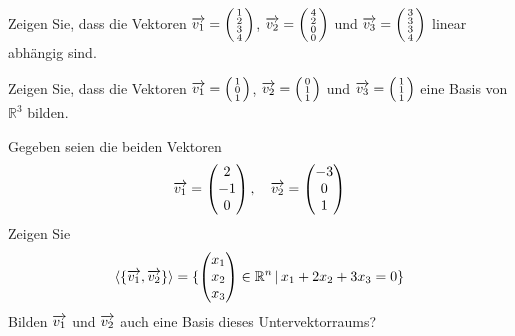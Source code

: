 \begin{aufgabe} Zeigen Sie, dass die Vektoren $\overrightarrow{v_1} = 
\left( \begin{smallmatrix} 1 \\ 2 \\ 3 \\ 4
\end{smallmatrix} \right)$, $\overrightarrow{v_2} = \left( \begin{smallmatrix} 4 \\ 2 \\ 0 \\ 0 
\end{smallmatrix} \right)$ und $\overrightarrow{v_3} = \left( \begin{smallmatrix} 3 \\ 3 \\ 3 \\ 4 
\end{smallmatrix} \right)$ linear abhängig sind.
\end{aufgabe}

\begin{aufgabe} Zeigen Sie, dass die Vektoren  $\overrightarrow{v_1} = 
\left( \begin{smallmatrix} 1 \\ 0 \\ 1 \end{smallmatrix} \right)$, 
$\overrightarrow{v_2} = \left( \begin{smallmatrix} 0 \\ 1 \\ 1 
\end{smallmatrix} \right)$ und $\overrightarrow{v_3} = \left( \begin{smallmatrix} 1 \\ 1 \\  1 
\end{smallmatrix} \right)$ eine Basis von $\mathbb R^3$ bilden.
\end{aufgabe}

\begin{aufgabe} Gegeben seien die beiden Vektoren
  $$ \overrightarrow{v_1} = \left( \begin{matrix} 2 \\ -1 \\ 0  \end{matrix} \right), \quad  
     \overrightarrow{v_2} = \left( \begin{matrix} -3 \\ 0 \\ 1  \end{matrix} \right) $$
Zeigen Sie 
  $$ \langle \{ \overrightarrow{v_1}, \overrightarrow{v_2} \} \rangle = 
    \{  \left( \begin{matrix} x_1 \\ x_2 \\ x_3  \end{matrix} \right) \in \mathbb R^n 
    \, \vert \, x_1 + 2 x_2 + 3 x_3 = 0 \} $$
Bilden $\overrightarrow{v_1}$ und $\overrightarrow{v_2}$ auch eine Basis dieses 
Untervektorraums?
\end{aufgabe}

